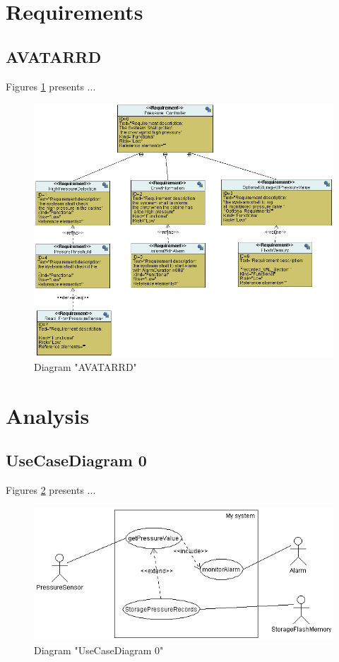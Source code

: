 
\section{Requirements}
\subsection{AVATARRD}
Figures \ref{fig:AVATARRDAVATARRD00} presents ...
\begin{figure}[htb]
\centering
\includegraphics[width=\textwidth]{img_0_0.png}
\caption{Diagram "AVATARRD"}
\label{fig:AVATARRDAVATARRD00}
\end{figure}

\section{Analysis}
\subsection{UseCaseDiagram 0}
Figures \ref{fig:UseCaseDiagram 0UseCaseDiagram 010} presents ...
\begin{figure}[htb]
\centering
\includegraphics[width=\textwidth]{img_1_0.png}
\caption{Diagram "UseCaseDiagram 0"}
\label{fig:UseCaseDiagram 0UseCaseDiagram 010}
\end{figure}


